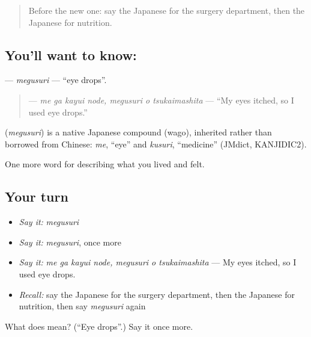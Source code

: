 \begin{quote}
Before the new one: say the Japanese for the surgery department, then the Japanese for nutrition.
\end{quote}

\subsection*{You'll want to know: }
\textbf{} — \emph{megusuri} — \textquotedblleft{}eye drops\textquotedblright{}.

\begin{quote}
\textbf{  } — \emph{me ga kayui node, megusuri o tsukaimashita} — \textquotedblleft{}My eyes itched, so I used eye drops.\textquotedblright{}
\end{quote}

\begin{cousinweb}
\textbf{} (\emph{megusuri}) is a native Japanese compound (wago), inherited rather than borrowed from Chinese: \emph{me}, \textquotedblleft{}eye\textquotedblright{} and \emph{kusuri}, \textquotedblleft{}medicine\textquotedblright{} (JMdict, KANJIDIC2).
\end{cousinweb}

\begin{grammarlens}[title={What you've built}]
One more word for describing what you lived and felt.
\end{grammarlens}

\subsection*{Your turn}
\begin{itemize}
\raggedright
  \item \emph{Say it:} \emph{megusuri}
  \item \emph{Say it:} \emph{megusuri}, once more
  \item \emph{Say it:} \emph{me ga kayui node, megusuri o tsukaimashita} — My eyes itched, so I used eye drops.
  \item \emph{Recall:} say the Japanese for the surgery department, then the Japanese for nutrition, then say \emph{megusuri} again
\end{itemize}

\begin{tcolorbox}[breakable,colback=teal!4,colframe=teal!35!black,title={Before you move on}]
What does  mean? (\textquotedblleft{}Eye drops\textquotedblright{}.) Say it once more.
\end{tcolorbox}
